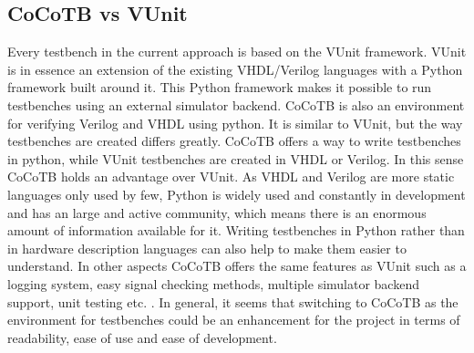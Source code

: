 \subsection{CoCoTB vs VUnit}
Every testbench in the current approach is based on the VUnit framework. VUnit is in essence an extension of the existing VHDL/Verilog languages with a Python framework built around it. This Python framework makes it possible to run testbenches using an external simulator backend.
\npar
CoCoTB \cite{cocotb} is also an environment for verifying Verilog and VHDL using python. It is similar to VUnit, but the way testbenches are created differs greatly. CoCoTB offers a way to write testbenches in python, while VUnit testbenches are created in VHDL or Verilog.
\npar
In this sense CoCoTB holds an advantage over VUnit. As VHDL and Verilog are more static languages only used by few, Python is widely used and constantly in development and has an large and active community, which means there is an enormous amount of information available for it. Writing testbenches in Python rather than in hardware description languages can also help to make them easier to understand. In other aspects CoCoTB offers the same features as VUnit such as a logging system, easy signal checking methods, multiple simulator backend support, unit testing etc. .
\npar
In general, it seems that switching to CoCoTB as the environment for testbenches could be an enhancement for the project in terms of readability, ease of use and ease of development.